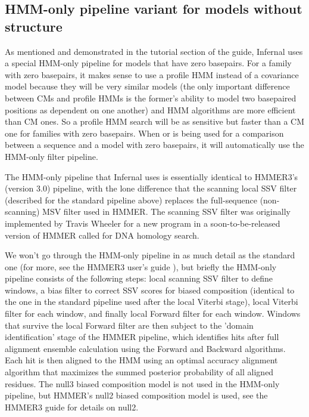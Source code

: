 \begin{sreoutput}
\subsection{HMM-only pipeline variant for models without structure}

As mentioned and demonstrated in the tutorial section of the guide,
Infernal uses a special HMM-only pipeline for models that have zero
basepairs. For a family with zero basepairs, it makes sense to use a
profile HMM instead of a covariance model because they will be very
similar models (the only important difference between CMs and profile
HMMs is the former's ability to model two basepaired positions as
dependent on one another) and HMM algorithms are more efficient than
CM ones. So a profile HMM search will be as sensitive but faster than
a CM one for families with zero basepairs.  When  or
 is being used for a comparison between a sequence and a
model with zero basepairs, it will automatically use the HMM-only
filter pipeline. 

The HMM-only pipeline that Infernal uses is essentially identical to
HMMER3's (version 3.0) pipeline, with the lone
difference that the scanning local SSV filter (described for the
standard pipeline above) replaces the full-sequence (non-scanning) MSV
filter used in HMMER. The scanning SSV filter was originally
implemented by Travis Wheeler for a new program in a
soon-to-be-released version of HMMER called  for DNA
homology search.

We won't go through the HMM-only pipeline in as much detail as the
standard one (for more, see the HMMER3 user's guide
\citep{hmmer3guide}), but briefly the HMM-only pipeline consists of
the following steps: local scanning SSV filter to define windows, a
bias filter to correct SSV scores for biased composition (identical to
the one in the standard pipeline used after the local Viterbi stage),
local Viterbi filter for each window, and finally local Forward filter
for each window. Windows that survive the local Forward filter are
then subject to the 'domain identification' stage of the HMMER
pipeline, which identifies hits after full alignment ensemble
calculation using the Forward and Backward algorithms. Each hit is
then aligned to the HMM using an optimal accuracy alignment algorithm
that maximizes the summed posterior probability of all aligned
residues. The null3 biased composition model is not used in the
HMM-only pipeline, but HMMER's null2 biased composition model is used,
see the HMMER3 guide for details on null2.


\end{sreoutput}
